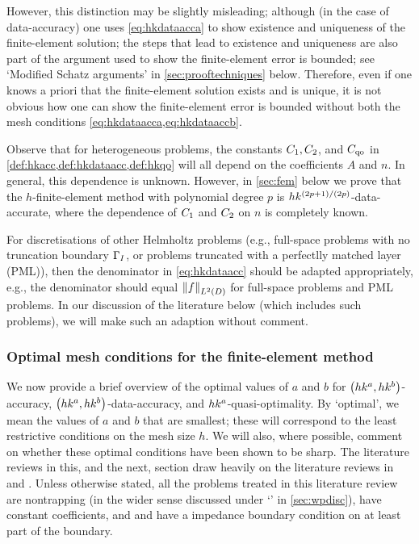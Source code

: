 However, this distinction may be slightly misleading; although (in the case of data-accuracy) one uses \cref{eq:hkdataacca} to show existence and uniqueness of the finite-element solution; the steps that lead to existence and uniqueness are also part of the argument used to show the finite-element error is bounded; see `Modified Schatz arguments' in \cref{sec:prooftechniques} below. Therefore, even if one knows a priori that the finite-element solution exists and is unique, it is not obvious how one can show the finite-element error is bounded without both the mesh conditions \cref{eq:hkdataacca,eq:hkdataaccb}.
\ere

\label{rem:accuracyhetero}
Observe that for heterogeneous problems, the constants $C_{1}, C_{2}$, and $C_{\mathrm{qo}}$ in \cref{def:hkacc,def:hkdataacc,def:hkqo} will all depend on the coefficients $A$ and $n.$ In general, this dependence is unknown. However, in \cref{sec:fem} below we prove that the $h$-finite-element method with polynomial degree $p$ is $hk^{(2p+1)/(2p)}$-data-accurate, where the dependence of $C_{1}$ and $C_{2}$ on $n$ is completely known.
\ere

For discretisations of other Helmholtz problems (e.g., full-space problems with no truncation boundary $\Gamma_{I}$, or problems truncated with a perfectlly matched layer (PML)), then the denominator in \cref{eq:hkdataacc} should be adapted appropriately, e.g., the denominator should equal $\NLtD{f}$ for full-space problems and PML problems. In our discussion of the literature below (which includes such problems), we will make such an adaption without comment.
\ere


\subsubsection{Optimal mesh conditions for the finite-element method}

We now provide a brief overview of the optimal values of $a$ and $b$ for $\hk{a}{b}$-accuracy, $\hk{a}{b}$-data-accuracy, and $hk^{a}$-quasi-optimality. By `optimal', we mean the values of $a$ and $b$ that are smallest; these will correspond to the least restrictive conditions on the mesh size $h$. We will also, where possible, comment on whether these optimal conditions have been shown to be sharp. The literature reviews in this, and the next, section draw heavily on the literature reviews in \cite[pp. 182--183]{GrLoMeSp:14} and \cite[p. 112]{DiMoSp:19}. Unless otherwise stated, all the problems treated in this literature review are nontrapping (in the wider sense discussed under `\techtitle' in \cref{sec:wpdisc}), have constant coefficients, and and have a impedance boundary condition on at least part of the boundary.

